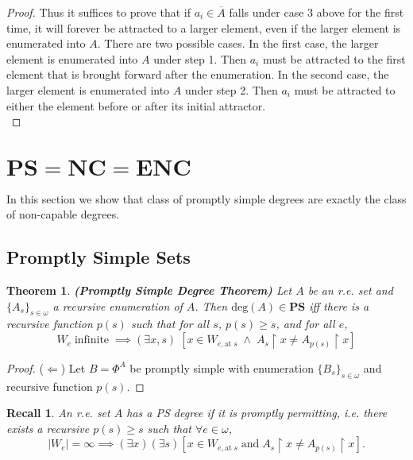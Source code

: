 \documentclass{article}
\newtheorem{theorem}{Theorem}[subsection]
\newtheorem{recall}{Recall}[subsection]
\begin{document}
\begin{proof}
    Thus it suffices to prove that if $a_i\in\overline{A}$ falls under case
    3 above for the first time, it will forever be attracted to a larger
    element, even if the larger element is enumerated into $A$. There are
    two possible cases. In the first case, the larger element is enumerated
    into $A$ under step 1. Then $a_i$ must be attracted to the first
    element that is brought forward after the enumeration. In the second
    case, the larger element is enumerated into $A$ under step 2. Then
    $a_i$ must be attracted to either the element before or after its
    initial attractor. \\
  \end{proof}

\section{$\bm{PS}=\bm{NC}=\bm{ENC}$}
  In this section we show that class of promptly simple degrees are exactly
  the class of non-capable degrees.

\subsection{Promptly Simple Sets}
  \begin{theorem}
    \textbf{(Promptly Simple Degree Theorem)} Let $A$ be an r.e. set and
    $\{A_s\}_{s\in\omega}$ a recursive enumeration of $A$. Then
    $\text{deg}(A) \in\bm{PS}$ iff there is a recursive function $p(s)$ such
    that for all $s$, $p(s)\geq s$, and for all $e$,
    \begin{equation}
      W_e\; \text{infinite}\; \implies (\exists x,s)\; [x\in
      W_{e,\text{at}\; s}\; \wedge\; A_s\restriction x \neq
      A_{p(s)}\restriction x]
      \label{eqn:promptly-permit}
    \end{equation}
  \end{theorem}
  \begin{proof}
    ($\Leftarrow$) Let $B=\Phi^A$ be promptly simple with enumeration
    $\{B_s\}_{s\in\omega}$ and recursive function $p(s)$.
  \end{proof}

  \begin{recall}
    An r.e. set $A$ has a PS degree if it is promptly permitting, i.e.
    there exists a recursive $p(s)\geq s$ such that $\forall e\in\omega$,
    \[|W_e|=\infty \implies (\exists x)(\exists s) [x\in W_{e, \text{at}\;
    s}\; \text{and}\; A_s\restriction x \neq A_{p(s)}\restriction x].\]
  \end{recall}
\end{document}
